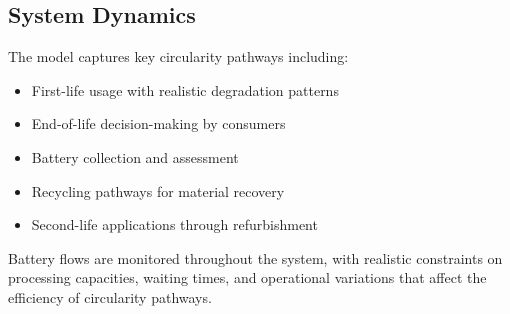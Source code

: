 \subsection{System Dynamics}
The model captures key circularity pathways including:
\begin{itemize}
    \item First-life usage with realistic degradation patterns
    \item End-of-life decision-making by consumers
    \item Battery collection and assessment
    \item Recycling pathways for material recovery
    \item Second-life applications through refurbishment
\end{itemize}

Battery flows are monitored throughout the system, with realistic constraints on processing capacities, waiting times, and operational variations that affect the efficiency of circularity pathways.